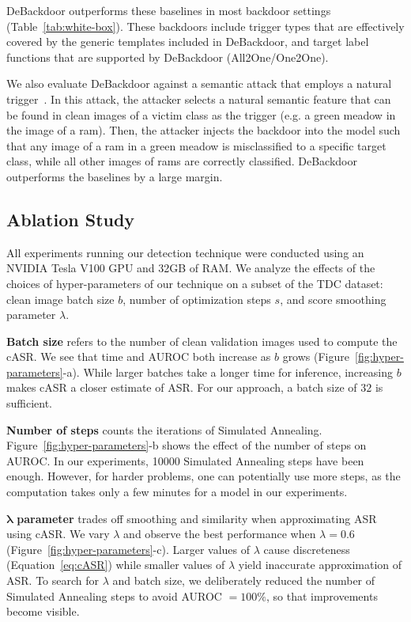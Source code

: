 \documentclass[letterpaper,twocolumn,10pt]{article}
\begin{document}
DeBackdoor outperforms these baselines in most backdoor settings (Table~\ref{tab:white-box}). These backdoors include trigger types that are effectively covered by the generic templates included in DeBackdoor, and target label functions that are supported by DeBackdoor (All2One/One2One).

We also evaluate DeBackdoor against a semantic attack that employs a natural trigger~\cite{fu2023eagle}. In this attack, the attacker selects a natural semantic feature that can be found in clean images of a victim class as the trigger (e.g. a green meadow in the image of a ram). Then, the attacker injects the backdoor into the model such that any image of a ram in a green meadow is misclassified to a specific target class, while all other images of rams are correctly classified. DeBackdoor outperforms the baselines by a large margin.

\subsection{Ablation Study}
\label{sec:ablation}

All experiments running our detection technique were conducted using an NVIDIA Tesla V100 GPU and 32GB of RAM. We analyze the effects of the choices of hyper-parameters of our technique on a subset of the TDC dataset: clean image batch size $b$, number of optimization steps $s$, and score smoothing parameter $\lambda$. 

\textbf{Batch size} refers to the number of clean validation images used to compute the cASR. We see that time and AUROC both increase as $b$ grows (Figure~\ref{fig:hyper-parameters}-a). While larger batches take a longer time for inference, increasing $b$ makes cASR a closer estimate of ASR. For our approach, a batch size of $32$ is sufficient.

\textbf{Number of steps} counts the iterations of Simulated Annealing. Figure~\ref{fig:hyper-parameters}-b shows the effect of the number of steps on AUROC. In our experiments, 10000 Simulated Annealing steps have been enough. However, for harder problems, one can potentially use more steps, as the computation takes only a few minutes for a model in our experiments.

$\boldsymbol{\lambda}$ \textbf{parameter} trades off smoothing and similarity when approximating ASR using cASR. We vary $\lambda$ and observe the best performance when $\lambda=0.6$ (Figure~\ref{fig:hyper-parameters}-c). Larger values of $\lambda$ cause discreteness (Equation~\ref{eq:cASR}) while smaller values of $\lambda$ yield inaccurate approximation of ASR. To search for $\lambda$ and batch size, we deliberately reduced the number of Simulated Annealing steps to avoid AUROC $=100\%$, so that improvements become visible.
\end{document}
